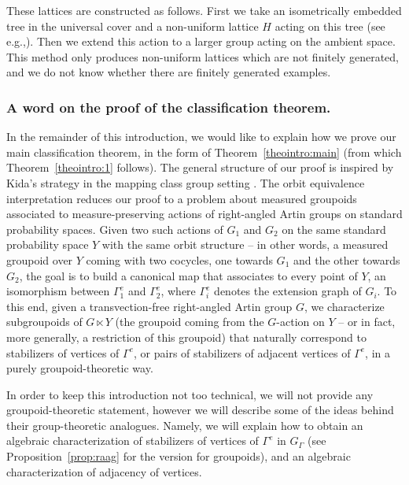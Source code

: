 \documentclass[11pt]{article}
\newcommand{\eg}{e.g.,\xspace}
\numberwithin{equation}{section}
\theoremstyle{plain}
\theoremstyle{definition}
\begin{document}
These lattices are constructed as follows. First we take an isometrically embedded tree in the universal cover and a non-uniform lattice $H$ acting on this tree (see \eg \cite{bass2001tree}). Then we extend this action to a larger group acting on the ambient space. This method only produces non-uniform lattices which are not finitely generated, and we do not know whether there are finitely generated examples.

\subsubsection*{A word on the proof of the classification theorem.}
In the remainder of this introduction, we would like to explain how we prove our main classification theorem, in the form of Theorem~\ref{theointro:main} (from which Theorem~\ref{theointro:1} follows). The general structure of our proof is inspired by Kida's strategy in the mapping class group setting \cite{Kid}. The orbit equivalence interpretation reduces our proof to a problem about measured groupoids associated to measure-preserving actions of right-angled Artin groups on standard probability spaces. Given two such actions of $G_1$ and $G_2$ on the same standard probability space $Y$ with the same orbit structure -- in other words, a measured groupoid over $Y$ coming with two cocycles, one towards $G_1$ and the other towards $G_2$, the goal is to build a canonical map that associates to every point of $Y$, an isomorphism between $\Gamma^e_1$ and $\Gamma_2^e$, where $\Gamma^e_i$ denotes the extension graph of $G_i$. To this end, given a transvection-free right-angled Artin group $G$, we characterize subgroupoids of $G\ltimes Y$ (the groupoid coming from the $G$-action on $Y$ -- or in fact, more generally, a restriction of this groupoid) that naturally correspond to stabilizers of vertices of $\Gamma^e$, or pairs of stabilizers of adjacent vertices of $\Gamma^e$, in a purely groupoid-theoretic way.

In order to keep this introduction not too technical, we will not provide any groupoid-theoretic statement, however we will describe some of the ideas behind their group-theoretic analogues. Namely, we will explain how to obtain an algebraic characterization of stabilizers of vertices of $\Gamma^e$ in $G_\Gamma$ (see Proposition~\ref{prop:raag} for the version for groupoids), and an algebraic characterization of adjacency of vertices.
\end{document}
